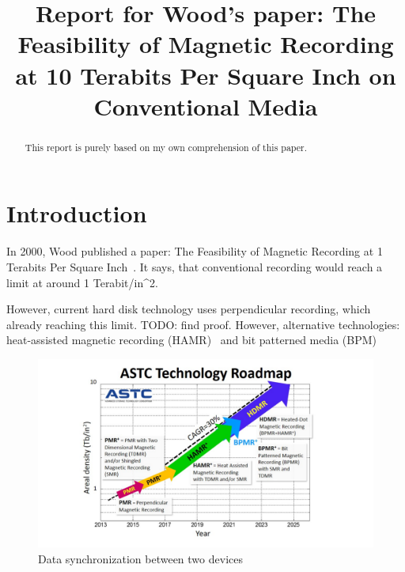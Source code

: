 \documentclass[conference]{IEEEtran}
\begin{document}
\title{Report for Wood's paper: 
The Feasibility of Magnetic Recording at 10 Terabits Per Square Inch on Conventional Media}

\author{
}

\maketitle

\begin{abstract}
This report is purely based on my own comprehension of this paper.
\end{abstract}

\IEEEpeerreviewmaketitle

\section{Introduction}
In 2000, Wood published a paper: The Feasibility of Magnetic Recording at 1 Terabits Per Square Inch~\cite{Wood}. It says, that conventional recording would reach a limit at around 1 Terabit/in^2.

However, current hard disk technology uses perpendicular recording, which already reaching this limit. TODO: find proof.
However, alternative technologies: heat-assisted magnetic recording (HAMR)~\cite{Rottmeyer} and bit patterned media (BPM)\cite{Terris}

\begin{figure}[!hbt]
\includegraphics[height=0.25\textheight]{ASTC}
\caption{Data synchronization between two devices}
\label{fig_sync_no_conflict}
\end{figure}
\end{document}
